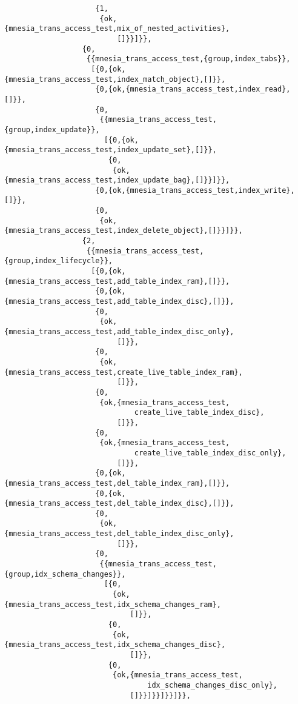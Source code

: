 \begin{verbatim}
                     {1,
                      {ok,{mnesia_trans_access_test,mix_of_nested_activities},
                          []}}]}},
                  {0,
                   {{mnesia_trans_access_test,{group,index_tabs}},
                    [{0,{ok,{mnesia_trans_access_test,index_match_object},[]}},
                     {0,{ok,{mnesia_trans_access_test,index_read},[]}},
                     {0,
                      {{mnesia_trans_access_test,{group,index_update}},
                       [{0,{ok,{mnesia_trans_access_test,index_update_set},[]}},
                        {0,
                         {ok,{mnesia_trans_access_test,index_update_bag},[]}}]}},
                     {0,{ok,{mnesia_trans_access_test,index_write},[]}},
                     {0,
                      {ok,{mnesia_trans_access_test,index_delete_object},[]}}]}},
                  {2,
                   {{mnesia_trans_access_test,{group,index_lifecycle}},
                    [{0,{ok,{mnesia_trans_access_test,add_table_index_ram},[]}},
                     {0,{ok,{mnesia_trans_access_test,add_table_index_disc},[]}},
                     {0,
                      {ok,{mnesia_trans_access_test,add_table_index_disc_only},
                          []}},
                     {0,
                      {ok,{mnesia_trans_access_test,create_live_table_index_ram},
                          []}},
                     {0,
                      {ok,{mnesia_trans_access_test,
                              create_live_table_index_disc},
                          []}},
                     {0,
                      {ok,{mnesia_trans_access_test,
                              create_live_table_index_disc_only},
                          []}},
                     {0,{ok,{mnesia_trans_access_test,del_table_index_ram},[]}},
                     {0,{ok,{mnesia_trans_access_test,del_table_index_disc},[]}},
                     {0,
                      {ok,{mnesia_trans_access_test,del_table_index_disc_only},
                          []}},
                     {0,
                      {{mnesia_trans_access_test,{group,idx_schema_changes}},
                       [{0,
                         {ok,{mnesia_trans_access_test,idx_schema_changes_ram},
                             []}},
                        {0,
                         {ok,{mnesia_trans_access_test,idx_schema_changes_disc},
                             []}},
                        {0,
                         {ok,{mnesia_trans_access_test,
                                 idx_schema_changes_disc_only},
                             []}}]}}]}}]}},

\end{verbatim}
